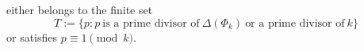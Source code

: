 either belongs to the finite set 
\begin{equation*}
T:=\{p: p \ \text{is a prime divisor of} \ \Delta(\Phi_{{k}}) \ \text{or a prime divisor of} \ {k}\}
\end{equation*}
or satisfies $p\equiv 1 \pmod{{k}}$.